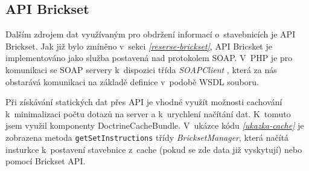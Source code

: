 
\subsection{API Brickset}
Dalším zdrojem dat využívaným pro obdržení informací o~stavebnicích je API Brickset. Jak již bylo zmíněno v~sekci \emph{\ref{reserse-brickset}}, API Bricsket je implementováno jako služba postavená nad protokolem \gls{SOAP}. V~PHP je pro komunikaci se SOAP servery k~dispozici třída \textit{SOAPClient} \autocite{soapclient}, která za nás obstarává komunikaci na základě definice v~podobě \gls{WSDL} souboru. 

Při získávání statických dat přes API je vhodné využít možnosti cachování k~minimalizaci počtu dotazů na server a k~urychlení načítání dat. K~tomuto jsem využil komponenty DoctrineCacheBundle. V~ukázce kódu \emph{\ref{ukazka-cache}} je zobrazena metoda \texttt{getSetInstructions} třídy \textit{BricksetManager}, která načítá insturkce k~postavení stavebnice z~cache (pokud se zde data již vyskytují) nebo pomocí Brickset API. 

